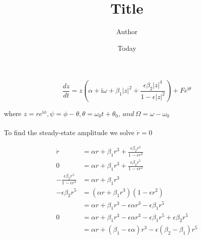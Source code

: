 \documentclass[]{article}
\begin{document}
\title{Title}
\author{Author}
\date{Today}
\maketitle

 $$\frac{dz}{dt} = z\left(\alpha + \textrm{i}\omega + 
 \beta_1 |z|^2 + \frac{\epsilon\beta_2|z|^4}
 {1-\epsilon |z|^2}\right) + Fe^{\textrm{i}\theta}$$

 where $z = re^{\textrm{i}\phi}, \psi = \phi - \theta,
 \theta = \omega_0t + \theta_0, ~and~ \Omega = \omega - \omega_0$\\\\

\noindent 
To find the steady-state amplitude we solve $\dot{r} = 0$

\begin{align*}
\dot{r} &= \alpha r + \beta_1r^3 +\frac{\epsilon \beta_2 r^5 }{1 - \epsilon r^2}\\
0 &= \alpha r + \beta_1r^3 +\frac{\epsilon \beta_2 r^5 }{1 - \epsilon r^2}\\
-\frac{\epsilon \beta_2 r^5 }{1 - \epsilon r^2} &= \alpha r + \beta_1r^3 \\
-\epsilon \beta_2 r^5  &= (\alpha r + \beta_1r^3)(1 - \epsilon r^2) \\
&= \alpha r + \beta_1r^3 - \epsilon \alpha r^3 - \epsilon \beta_1 r^5 \\
0 &= \alpha r + \beta_1r^3 - \epsilon \alpha r^3 - \epsilon \beta_1 r^5 + \epsilon \beta_2 r^5\\
&= \alpha r + (\beta_1 - \epsilon \alpha) r^3 - \epsilon (\beta_2 - \beta_1) r^5\\
\end{align*}
\end{document}
